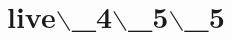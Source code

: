 \documentclass{article}
\begin{document}
\section*{live$\backslash$_4$\backslash$_5$\backslash$_5}
\begin{psgoboard}[5]
\setcounter{gomove}{0}
\end{psgoboard}
\end{document}

